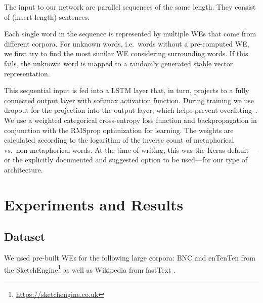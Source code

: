 \documentclass[11pt,a4paper]{article}
\begin{document}
The input to our network are parallel sequences of the same length. They consist of (insert length) sentences.

Each single word in the sequence is represented by multiple WEs that come from different corpora. %
For unknown words, i.e.~words without a pre-computed WE, we first try to
find the most similar WE considering %
surrounding words.  
If this fails, the unknown word is mapped to a randomly generated stable vector
representation.

This sequential input is fed into a LSTM layer that, in turn, projects to a
fully connected output layer with softmax activation function.
During training we use dropout for the projection into the output layer,
which helps prevent overfitting~\cite{Srivastava2014}.
We use a weighted categorical cross-entropy loss function and backpropagation in
conjunction with the RMSprop optimization for learning.  The weights are calculated according to the logarithm of the inverse count of metaphorical vs.~non-metaphorical words.
At the time of writing, this was the Keras default---or the explicitly
documented and suggested option to be used---for our type of architecture. 


\section{Experiments and Results} %
\label{sec:results}

\subsection{Dataset} %
We used pre-built WEs for the following large corpora: BNC and enTenTen \cite{1120431}
from the SketchEngine\footnote{\url{https://sketchengine.co.uk}}
\cite{DBLP:journals/corr/BojanowskiGJM16} as well as Wikipedia from fastText
\cite{mikolov2018advances}. 
\end{document}
